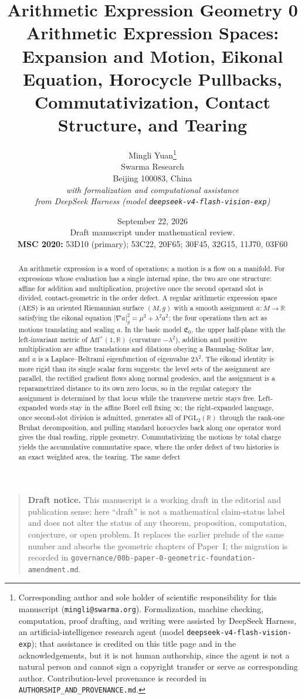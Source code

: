 \documentclass[11pt]{article}
\title{\textbf{Arithmetic Expression Geometry 0}\\[0.35em]
\large Arithmetic Expression Spaces: Expansion and Motion, Eikonal Equation,
Horocycle Pullbacks, Commutativization, Contact Structure, and Tearing}
\author{
Mingli Yuan\thanks{Corresponding author and sole holder of scientific
responsibility for this manuscript
(\texttt{mingli@swarma.org}).  Formalization, machine checking, computation,
proof drafting, and writing were assisted by DeepSeek Harness, an
artificial-intelligence research agent (model
\texttt{deepseek-v4-flash-vision-exp}); that assistance is credited on this
title page and in the acknowledgements, but it is not human authorship, since
the agent is not a natural person and cannot sign a copyright transfer or serve
as corresponding author.  Contribution-level provenance is recorded in
\texttt{AUTHORSHIP\_AND\_PROVENANCE.md}.}\\
\small Swarma Research\\
\small Beijing 100083, China\\[0.5em]
\small\itshape with formalization and computational assistance\\
\small\itshape from DeepSeek Harness
(model \texttt{deepseek-v4-flash-vision-exp})
}
\date{September 22, 2026\\[0.25em]
\small Draft manuscript under mathematical review.\\[0.35em]
\small
\textbf{MSC 2020:} 53D10 (primary); 53C22, 20F65;
30F45, 32G15, 11J70, 03F60}
\theoremstyle{definition}
\theoremstyle{remark}
\begin{document}
\maketitle

\begin{quote}\small
\textbf{Draft notice.}
This manuscript is a working draft in the editorial and publication sense; here
``draft'' is not a mathematical claim-status label and does not alter the status
of any theorem, proposition, computation, conjecture, or open problem.  It
replaces the earlier prelude of the same number and absorbs the geometric
chapters of Paper~I; the migration is recorded in
\texttt{governance/00b-paper-0-geometric-foundation-amendment.md}.
\end{quote}

\begin{abstract}
An arithmetic expression is a word of operations; a motion is a flow on a
manifold.  For expressions whose evaluation has a single internal spine, the two
are one structure: affine for addition and multiplication, projective once the
second operand slot is divided, contact-geometric in the order defect.  A
regular arithmetic expression space (AES) is an oriented Riemannian surface
$(M,g)$ with a smooth assignment $a\colon M\to\mathbb R$ satisfying the eikonal
equation $|\nabla a|_g^2=\mu^2+\lambda^2a^2$; the four operations then act as
motions translating and scaling $a$.  In the basic model $\mathfrak E_0$, the
upper half-plane with the left-invariant metric of
$\mathrm{Aff}^+(1,\mathbb R)$ (curvature $-\lambda^2$), addition and positive
multiplication are affine translations and dilations obeying a
Baumslag--Solitar law, and $a$ is a Laplace--Beltrami eigenfunction of
eigenvalue $2\lambda^2$.  The eikonal identity is more rigid than its single
scalar form suggests: the level sets of the assignment are parallel, the
rectified gradient flows along normal geodesics, and the assignment is a
reparametrized distance to its own zero locus, so in the regular category the
assignment is determined by that locus while the transverse metric stays free.
Left-expanded words stay in the affine Borel cell
fixing $\infty$; the right-expanded language, once second-slot division is
admitted, generates all of $\mathrm{PGL}_2(\mathbb R)$ through the rank-one
Bruhat decomposition, and pulling standard horocycles back along one operator
word gives the dual reading, ripple geometry.  Commutativizing the motions
by total charge yields the accumulative commutative space, where the order
defect of two histories is an exact weighted area, the tearing.  The same defect

\end{abstract}
\end{document}
